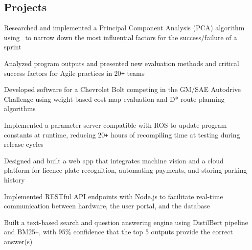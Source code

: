 \documentclass{mxresume}
\begin{document}
\begin{minipage}[t]{0.73\textwidth}
\begin{resumebody}
\begin{large}
\section*{Projects}
%
\begin{tightemize}{5mm}
\item Researched and implemented a Principal Component Analysis (PCA) algorithm using \Csharp\ to narrow down the most influential factors for the success/failure of a sprint
\item Analyzed program outputs and presented new evaluation methods and critical success factors for Agile practices in 20\texttt{+} teams
\end{tightemize}
%
%
\begin{tightemize}{5mm}
\item Developed software for a Chevrolet Bolt competing in the GM/SAE Autodrive Challenge using weight-based cost map evaluation and D* route planning algorithms
\item Implemented a parameter server compatible with ROS to update program constants at runtime, reducing 20\texttt{+} hours of recompiling time at testing during release cycles
\end{tightemize}
%
%
\begin{tightemize}{5mm}
\item Designed and built a web app that integrates machine vision and a cloud platform for licence plate recognition, automating payments, and storing parking history
\item Implemented RESTful API endpoints with Node.js to facilitate real-time communication between hardware, the user portal, and the database
\end{tightemize}
%
%
\begin{tightemize}{5mm}
\item Built a text-based search and question answering engine using DistilBert pipeline and BM25\texttt{+}, with 95\textsc{\%} confidence that the top 5 outputs provide the correct answer(s)
\end{tightemize}
\end{large}
\end{resumebody}
\end{minipage}
\hfill
\end{document}

